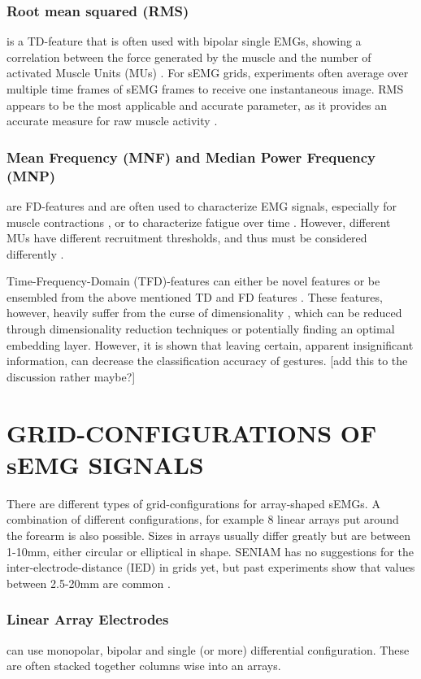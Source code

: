 \documentclass{article}
\begin{document}
\subsubsection{Root mean squared (RMS)} \cite{Kendell2012} \cite{Nazmi2016} is a TD-feature that is often used with bipolar single EMGs, showing a correlation between the force generated by the muscle and the number of activated Muscle Units (MUs) \cite{}. For sEMG grids, experiments often average over multiple time frames of sEMG frames to receive one instantaneous image. RMS appears to be the most applicable and accurate parameter, as it provides an accurate measure for raw muscle activity \cite{Nazmi2016}.
\subsubsection{Mean Frequency (MNF) and Median Power Frequency (MNP)} are FD-features and are often used to characterize EMG signals, especially for muscle contractions \cite{Merletti1997}, or to characterize fatigue over time \cite{Phinyomark2009}. However, different MUs have different recruitment thresholds, and thus must be considered differently \cite{Linnamo2002} \cite{Kossev1998} \cite{Nazmi2016}. 

Time-Frequency-Domain (TFD)-features can either be novel features or be ensembled from the above mentioned TD and FD features \cite{Guo2016}. These features, however, heavily suffer from the curse of dimensionality \cite{Boccia2015}, which can be reduced through dimensionality reduction techniques \cite{Nazmi2016} or potentially finding an optimal embedding layer. However, it is shown that leaving certain, apparent insignificant information, can decrease the classification accuracy of gestures. [add this to the discussion rather maybe?]


\section{GRID-CONFIGURATIONS OF sEMG SIGNALS \cite{Kilby2016}}
There are different types of grid-configurations for array-shaped sEMGs. A combination of different configurations, for example 8 linear arrays put around the forearm is also possible. Sizes in arrays usually differ greatly but are between 1-10mm, either circular or elliptical in shape.
SENIAM has no suggestions for the inter-electrode-distance (IED) in grids yet, but past experiments show that values between 2.5-20mm are common \cite{Kilby2016}.

\subsubsection{Linear Array Electrodes} can use monopolar, bipolar and single (or more) differential configuration. These are often stacked together columns wise into an arrays.
\end{document}
